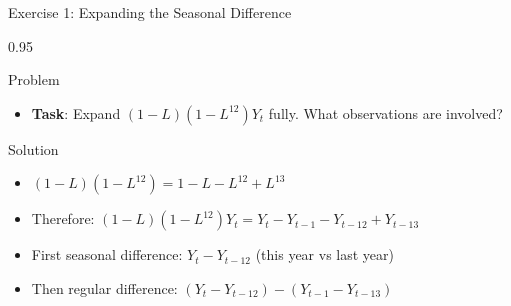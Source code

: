 \documentclass[9pt, aspectratio=169, t]{beamer}
\begin{document}
\begin{frame}{Exercise 1: Expanding the Seasonal Difference}
    \begin{cminipage}{0.95\textwidth}
    \begin{alertblock}{Problem}
        \begin{itemize}\setlength{\itemsep}{0pt}
            \item \textbf{Task}: Expand $(1-L)(1-L^{12})Y_t$ fully. What observations are involved?
        \end{itemize}
    \end{alertblock}

    \vspace{0.2cm}
    \begin{exampleblock}{Solution}
        \begin{itemize}\setlength{\itemsep}{0pt}
            \item $(1-L)(1-L^{12}) = 1 - L - L^{12} + L^{13}$
            \item Therefore: $(1-L)(1-L^{12})Y_t = Y_t - Y_{t-1} - Y_{t-12} + Y_{t-13}$
            \item First seasonal difference: $Y_t - Y_{t-12}$ (this year vs last year)
            \item Then regular difference: $(Y_t - Y_{t-12}) - (Y_{t-1} - Y_{t-13})$
        \end{itemize}
    \end{exampleblock}
    \end{cminipage}
\end{frame}
\end{document}
